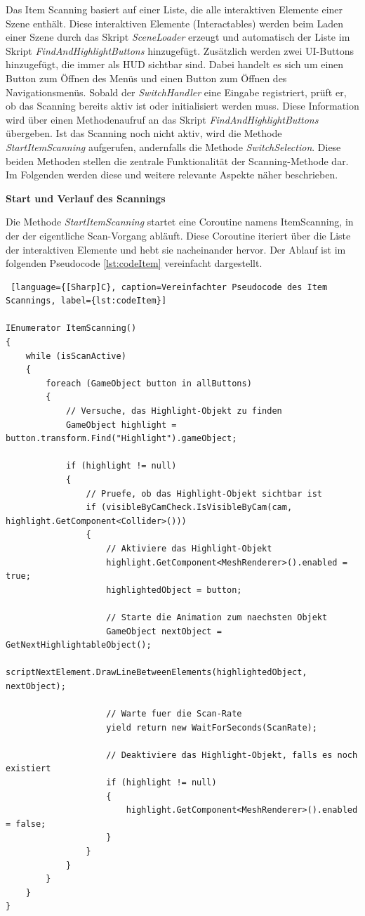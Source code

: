 Das Item Scanning basiert auf einer Liste, die alle interaktiven Elemente einer Szene enthält. Diese interaktiven Elemente (Interactables) werden beim Laden einer Szene durch das Skript \textit{SceneLoader} erzeugt und automatisch der Liste im Skript \textit{FindAndHighlightButtons} hinzugefügt. Zusätzlich werden zwei UI-Buttons hinzugefügt, die immer als HUD sichtbar sind. Dabei handelt es sich um einen Button zum Öffnen des Menüs und einen Button zum Öffnen des Navigationsmenüs. Sobald der \textit{SwitchHandler} eine Eingabe registriert, prüft er, ob das Scanning bereits aktiv ist oder initialisiert werden muss. Diese Information wird über einen Methodenaufruf an das Skript \textit{FindAndHighlightButtons} übergeben. Ist das Scanning noch nicht aktiv, wird die Methode \textit{StartItemScanning} aufgerufen, andernfalls die Methode \textit{SwitchSelection}. Diese beiden Methoden stellen die zentrale Funktionalität der Scanning-Methode dar. Im Folgenden werden diese und weitere relevante Aspekte näher beschrieben.

\textbf{Start und Verlauf des Scannings}

Die Methode \textit{StartItemScanning} startet eine Coroutine namens ItemScanning, in der der eigentliche Scan-Vorgang abläuft. Diese Coroutine iteriert über die Liste der interaktiven Elemente und hebt sie nacheinander hervor. Der Ablauf ist im folgenden Pseudocode \autoref{lst:codeItem} vereinfacht dargestellt.

\begin{lstlisting} [language={[Sharp]C}, caption=Vereinfachter Pseudocode des Item Scannings, label={lst:codeItem}]

IEnumerator ItemScanning()
{
    while (isScanActive)
    {
        foreach (GameObject button in allButtons)
        {
            // Versuche, das Highlight-Objekt zu finden
            GameObject highlight = button.transform.Find("Highlight").gameObject;
            
            if (highlight != null)
            {
                // Pruefe, ob das Highlight-Objekt sichtbar ist
                if (visibleByCamCheck.IsVisibleByCam(cam, highlight.GetComponent<Collider>()))
                {
                    // Aktiviere das Highlight-Objekt
                    highlight.GetComponent<MeshRenderer>().enabled = true;
                    highlightedObject = button;

                    // Starte die Animation zum naechsten Objekt
                    GameObject nextObject = GetNextHighlightableObject();
                    scriptNextElement.DrawLineBetweenElements(highlightedObject, nextObject);

                    // Warte fuer die Scan-Rate
                    yield return new WaitForSeconds(ScanRate);

                    // Deaktiviere das Highlight-Objekt, falls es noch existiert
                    if (highlight != null)
                    {
                        highlight.GetComponent<MeshRenderer>().enabled = false;
                    }
                }
            }
        }
    }
}

\end{lstlisting}


